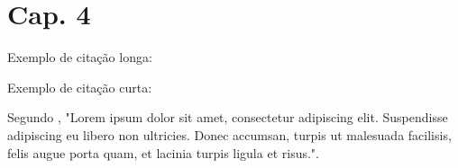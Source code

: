 \chapter{Cap. 4}

Exemplo de citação longa:

\begin{citacao}
\lipsum[1] \cite[5.3]{abntex2cite-alf}
\end{citacao}

Exemplo de citação curta:

Segundo \cite{abntex2cite}, "Lorem ipsum dolor sit amet, consectetur adipiscing elit. Suspendisse adipiscing eu libero non ultricies. Donec accumsan, turpis ut malesuada facilisis, felis augue porta quam, et lacinia turpis ligula et risus.".
